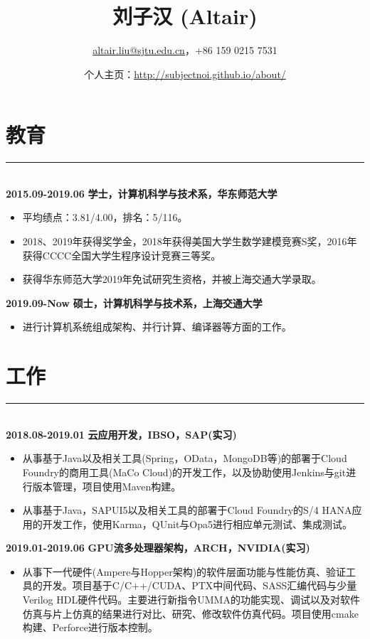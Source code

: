 \documentclass[a4paper]{article}
\title{刘子汉 (Altair)}
\author{\url{altair.liu@sjtu.edu.cn}，+86 159 0215 7531}
\date{个人主页：\url{http://subjectnoi.github.io/about/}}
\begin{document}
		\maketitle
		\section*{教育}
		\rule[1pt]{18cm}{0.01em}\\
		\textbf{2015.09-2019.06} \hfill \textbf{学士，计算机科学与技术系，华东师范大学}
		\begin{itemize}
		\item 平均绩点：3.81/4.00，排名：5/116。
		\item 2018、2019年获得奖学金，2018年获得美国大学生数学建模竞赛S奖，2016年获得CCCC全国大学生程序设计竞赛三等奖。
		\item 获得华东师范大学2019年免试研究生资格，并被上海交通大学录取。
		\end{itemize}
		\textbf{2019.09-Now} \hfill \textbf{硕士，计算机科学与技术系，上海交通大学}
		\begin{itemize}
		\item 进行计算机系统组成架构、并行计算、编译器等方面的工作。
		\end{itemize}
		\section*{工作}
		\rule[1pt]{18cm}{0.01em}\\
		\textbf{2018.08-2019.01} \hfill \textbf{云应用开发，IBSO，SAP(实习)}
		\begin{itemize}
		\item 从事基于Java以及相关工具(Spring，OData，MongoDB等)的部署于Cloud Foundry的商用工具(MaCo Cloud)的开发工作，以及协助使用Jenkins与git进行版本管理，项目使用Maven构建。
		\item 从事基于Java，SAPUI5以及相关工具的部署于Cloud Foundry的S/4 HANA应用的开发工作，使用Karma，QUnit与Opa5进行相应单元测试、集成测试。
		\end{itemize}
		\textbf{2019.01-2019.06} \hfill \textbf{GPU流多处理器架构，ARCH，NVIDIA(实习)}
		\begin{itemize}
		\item 从事下一代硬件(Ampere与Hopper架构)的软件层面功能与性能仿真、验证工具的开发。项目基于C/C++/CUDA、PTX中间代码、SASS汇编代码与少量Verilog HDL硬件代码。主要进行新指令UMMA的功能实现、调试以及对软件仿真与片上仿真的结果进行对比、研究、修改软件仿真代码。项目使用cmake构建、Perforce进行版本控制。
		\end{itemize}
\end{document}
